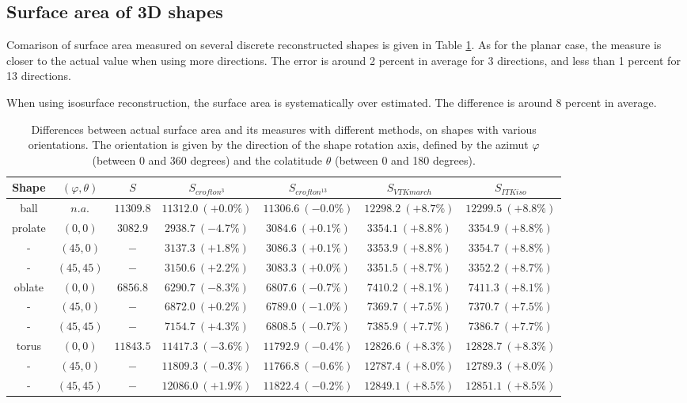 \documentclass{InsightArticle}
\begin{document}

\subsection{Surface area of 3D shapes}

Comarison of surface area measured on several discrete reconstructed shapes is given in
Table \ref{tab:CompareSurfaceArea}.
As for the planar case, the measure is closer to the actual value when using more
directions. The error is around 2 percent in average for 3 directions, and less than
1 percent for 13 directions.

When using isosurface reconstruction, the surface area is systematically over estimated.
The difference is around 8 percent in average.

\begin{table}[!htb]
\begin{center}\begin{tabular}{ccccccc}
Shape      & $(\varphi,\theta)$ & $S$            & $S_{crofton^3}$     & $S_{crofton^{13}}$  & $S_{VTKmarch}$       & $S_{ITKiso}$  \tabularnewline
\hline 
\hline 
ball       & $n.a.$             &     $11309.8$  & $11312.0\ (+0.0\%)$ & $11306.6\ (-0.0\%)$ & $12298.2\ (+8.7\%)$  & $12299.5\ (+8.8\%)$ \tabularnewline 
prolate    & $( 0,  0)$         &     $3082.9$   & $2938.7\ (-4.7\%)$  & $3084.6\ (+0.1\%)$  & $3354.1\ (+8.8\%)$   & $3354.9\ (+8.8\%)$  \tabularnewline
-          & $(45,  0)$         &     $-$        & $3137.3\ (+1.8\%)$  & $3086.3\ (+0.1\%)$  & $3353.9\ (+8.8\%)$   & $3354.7\ (+8.8\%)$  \tabularnewline
-          & $(45, 45)$         &     $-$        & $3150.6\ (+2.2\%)$  & $3083.3\ (+0.0\%)$  & $3351.5\ (+8.7\%)$   & $3352.2\ (+8.7\%)$  \tabularnewline
oblate     & $( 0,  0)$         &     $6856.8$   & $6290.7\ (-8.3\%)$  & $6807.6\ (-0.7\%)$  & $7410.2\ (+8.1\%)$   & $7411.3\ (+8.1\%)$  \tabularnewline
-          & $(45,  0)$         &     $-$        & $6872.0\ (+0.2\%)$  & $6789.0\ (-1.0\%)$  & $7369.7\ (+7.5\%)$   & $7370.7\ (+7.5\%)$  \tabularnewline
-          & $(45, 45)$         &     $-$        & $7154.7\ (+4.3\%)$  & $6808.5\ (-0.7\%)$  & $7385.9\ (+7.7\%)$   & $7386.7\ (+7.7\%)$  \tabularnewline
torus      & $( 0,  0)$         &     $11843.5$  & $11417.3\ (-3.6\%)$ & $11792.9\ (-0.4\%)$ & $12826.6\ (+8.3\%)$  & $12828.7\ (+8.3\%)$ \tabularnewline
-          & $(45,  0)$         &     $-$        & $11809.3\ (-0.3\%)$ & $11766.8\ (-0.6\%)$ & $12787.4\ (+8.0\%)$  & $12789.3\ (+8.0\%)$ \tabularnewline
-          & $(45, 45)$         &     $-$        & $12086.0\ (+1.9\%)$ & $11822.4\ (-0.2\%)$ & $12849.1\ (+8.5\%)$  & $12851.1\ (+8.5\%)$ \tabularnewline
\hline 
\end{tabular}\end{center}
\caption{ \label{tab:CompareSurfaceArea}
Differences between actual surface area and its measures with different methods, 
on shapes with various orientations.
The orientation is given by the direction of the shape rotation axis, defined by 
the azimut $\varphi$ (between 0 and 360 degrees) and the colatitude $\theta$ (between 0 and 180 degrees).}
\end{table}
\end{document}
